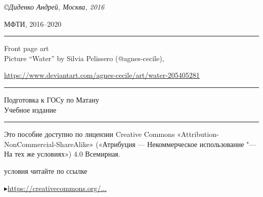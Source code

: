 \slshape
\normalsize
\medskip
\copyright\enspace Диденко Андрей, Москва, 2016

\medspace

МФТИ, 2016--2020
\center
\rule{\textwidth}{0.4pt}
\medspace

{\Huge Front page art}
\\[1\baselineskip]
Picture ``Water'' by Silvia Pelissero (@agnes-cecile),

\href{https://www.deviantart.com/agnes-cecile/art/water-205405281}{https://www.deviantart.com/agnes-cecile/art/water-205405281}

\rule{\textwidth}{0.4pt}
\medspace
\vspace*{7\baselineskip}

{\Huge Подготовка к ГОСу по Матану}
\\[2\baselineskip]
{\Large Учебное издание}

\vspace*{\fill}
\rule{\textwidth}{0.4pt}
\noindent
\begin{minipage}[t]{0.61\textwidth}
\quad\small Это пособие доступно по лицензии Creative Commons «Attribution-NonCommercial-ShareAlike» («Атрибуция — Некоммерческое использование "--- На тех же условиях») 4.0 Всемирная.

 условия читайте по ссылке

\qquad$\blacktriangleright$\href{https://creativecommons.org/licenses/by-nc-sa/4.0/deed.ru}{https://creativecommons.org/...}
\end{minipage}%
\hfill%
\begin{minipage}[t]{\dimexpr(0.4\textwidth-2mm)}
\end{minipage}
